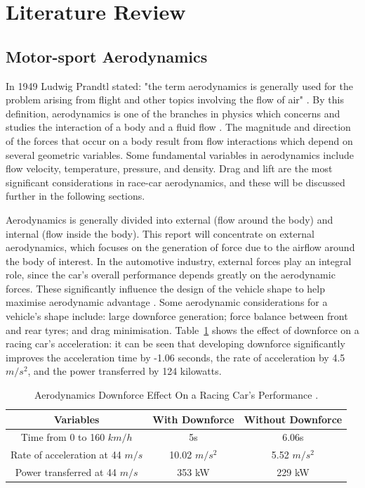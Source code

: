 \section{Literature Review}

\subsection{Motor-sport Aerodynamics}
In 1949 Ludwig Prandtl stated: "the term aerodynamics is generally used for the problem arising from flight and other topics involving the flow of air" \cite{Anderson2010FundamentalsAerodynamics}. By this definition, aerodynamics is one of the branches in physics which concerns and studies the interaction of a body and a fluid flow \cite{Scibor-Rylski1984RoadAerodynamics}. The magnitude and direction of the forces that occur on a body result from flow interactions which depend on several geometric variables. Some fundamental variables in aerodynamics include flow velocity, temperature, pressure, and density. Drag and lift are the most significant considerations in race-car aerodynamics, and these will be discussed further in the following sections.

\noindent Aerodynamics is generally divided into external (flow around the body) and internal (flow inside the body). This report will concentrate on external aerodynamics, which focuses on the generation of force due to the airflow around the body of interest. In the automotive industry, external forces play an integral role, since the car's overall performance depends greatly on the aerodynamic forces. These significantly influence the design of the vehicle shape to help maximise aerodynamic advantage \cite{Scibor-Rylski1984RoadAerodynamics}. Some aerodynamic considerations for a vehicle's shape include: large downforce generation; force balance between front and rear tyres; and drag minimisation. Table~\ref{Table1} shows the effect of downforce on a racing car's acceleration: it can be seen that developing downforce significantly improves the acceleration time by -1.06 seconds, the rate of acceleration by 4.5 $m/s^2$, and the power transferred by 124 kilowatts. 

\begin{table}[!ht]
\caption{\label{Table1} Aerodynamics Downforce Effect On a Racing Car's Performance \cite{Scibor-Rylski1984RoadAerodynamics}.}
\vspace{-5mm}
\begin{center}
 \begin{tabular}{||c| c| c ||} 
 \hline
 Variables & With Downforce & Without Downforce \\ [0.5ex] 
 \hline\hline
 Time from 0 to 160 $km/h$ & 5s & 6.06s \\ 
 \hline
 Rate of acceleration at 44 $m/s$ & 10.02 $m/s^{2}$ & 5.52 $m/s^2$ \\
 \hline
 Power transferred at 44 $m/s$ & 353 kW & 229 kW  \\
 \hline
\end{tabular}
\end{center}
\end{table}

